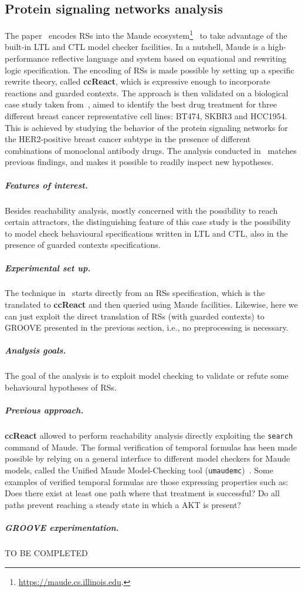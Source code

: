 
\subsection{Protein signaling networks analysis}

The paper~\cite{DBLP:conf/cmsb/BallisBFO24} encodes RSs into the Maude ecosystem\footnote{\url{https://maude.cs.illinois.edu}.}~\cite{DBLP:conf/maude/2007} to take advantage of the built-in LTL and CTL model checker facilities.
In a nutshell, Maude is a high-performance reflective language and system based on equational and rewriting logic specification. 
The encoding of RSs is made possible by setting up a specific rewrite theory, called \textbf{ccReact}, which is expressive enough to incorporate reactions and guarded contexts. 
The approach is then validated on a biological case study taken from~\cite{derHeyde2014}, aimed to identify the best drug treatment for three different breast cancer representative cell lines: BT474, SKBR3 and HCC1954. This is achieved by studying the behavior of the protein signaling networks for the HER2-positive breast cancer subtype in the presence of different combinations of monoclonal antibody drugs. The analysis conducted in~\cite{DBLP:conf/cmsb/BallisBFO24} matches previous findings, and makes it possible to readily inspect new hypotheses.

\subparagraph*{Features of interest.}
Besides reachability analysis, mostly concerned with the possibility to reach certain attractors, the distinguishing feature of this case study is the possibility to model check behavioural specifications written in LTL and CTL, also in the presence of guarded contexts specifications.

\subparagraph*{Experimental set up.}
The technique in~\cite{DBLP:conf/cmsb/BallisBFO24} starts directly from an RSs specification, which is the translated to \textbf{ccReact} and then queried using Maude facilities. Likewise, here we can just exploit the direct translation of RSs (with guarded contexts) to GROOVE presented in the previous section, i.e., no preprocessing is necessary.

\subparagraph*{Analysis goals.}
The goal of the analysis is to exploit model checking to validate or refute some behavioural hypotheses of RSs.

\subparagraph*{Previous approach.}
\textbf{ccReact} allowed to perform reachability analysis directly exploiting the \texttt{search} command of Maude. 
The formal verification of temporal formulas has been made possible by relying on a general interface to different model checkers for Maude models, called the Unified Maude Model-Checking tool (\texttt{umaudemc})~\cite{DBLP:journals/jlap/RubioMPV21}.
Some examples of verified temporal formulas are those expressing properties such as:
Does there exist at least one path where that treatment is successful?
Do all paths prevent reaching a steady state in which a AKT is present?

\subparagraph*{GROOVE experimentation.}
TO BE COMPLETED
